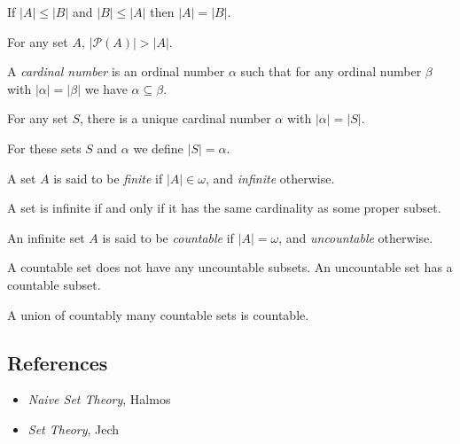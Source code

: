 \begin{thm}
  If $|A|\le|B|$ and $|B|\le|A|$ then $|A|=|B|$.
\end{thm}
\begin{thm}
  For any set $A$, $|\mathcal P(A)|>|A|$.
\end{thm}
\begin{defn}
  A \emph{cardinal number} is an ordinal number $\alpha$ such that for any
  ordinal number $\beta$ with $|\alpha|=|\beta|$ we have $\alpha\subseteq\beta$.
\end{defn}
\begin{prop}
  For any set $S$, there is a unique cardinal number $\alpha$ with
  $|\alpha|=|S|$.
\end{prop}
\begin{defn}
  For these sets $S$ and $\alpha$ we define $|S|=\alpha$.
\end{defn}
\begin{defn}
  A set $A$ is said to be \emph{finite} if $|A|\in\omega$, and \emph{infinite}
  otherwise.
\end{defn}
\begin{prop}
  A set is infinite if and only if it has the same cardinality as some proper
  subset.
\end{prop}
\begin{defn}
  An infinite set $A$ is said to be \emph{countable} if $|A|=\omega$, and
  \emph{uncountable} otherwise.
\end{defn}
\begin{prop}
  A countable set does not have any uncountable subsets. An uncountable set has
  a countable subset.
\end{prop}
\begin{prop}
  A union of countably many countable sets is countable.
\end{prop}
\subsection*{References}
\begin{itemize}
  \item \emph{Naive Set Theory}, Halmos
  \item \emph{Set Theory}, Jech
\end{itemize}
